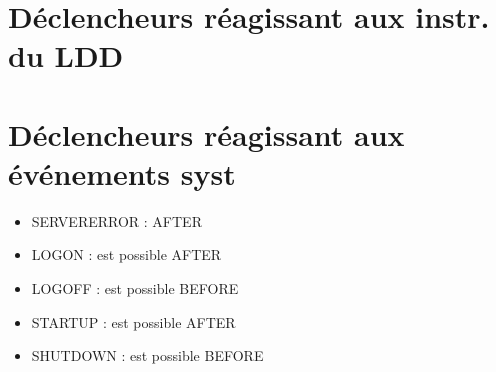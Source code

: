 \documentclass[10pt]{beamer}
\begin{document}
\begin{frame}[allowframebreaks]{\secname}
    
\end{frame}

\begin{frame}[allowframebreaks]{\secname}
    
\end{frame}



\section{Déclencheurs réagissant aux instr. du LDD}

\begin{frame}[allowframebreaks]{\secname}
    
\end{frame}

\begin{frame}[allowframebreaks]{\secname}
    
\end{frame}

\section{Déclencheurs réagissant aux événements syst}
\begin{frame}[allowframebreaks]{\secname}
    
\end{frame}

\begin{frame}[allowframebreaks]{\secname}
    \begin{itemize}
        \item SERVERERROR : AFTER
        \item LOGON : est possible AFTER
        \item LOGOFF : est possible BEFORE
        \item STARTUP : est possible AFTER
        \item SHUTDOWN : est possible BEFORE
    \end{itemize}
\end{frame}

\begin{frame}[allowframebreaks]{\secname}
    
\end{frame}
\end{document}
